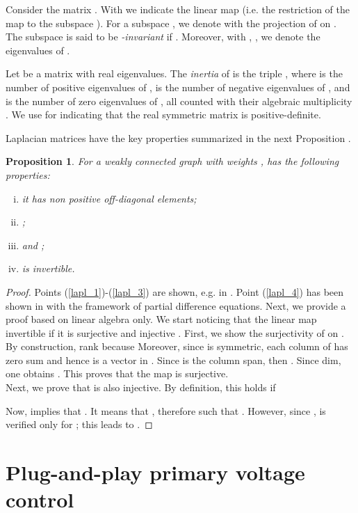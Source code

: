 \documentclass[a4paper]{article}
\theoremstyle{plain}
\newtheorem{prp}{Proposition}
\begin{document}
Consider the matrix . With
 we indicate the linear map 
(i.e. the restriction of the map
 to the subspace ). For a
subspace , we denote with
 the projection of  on
. The subspace  is said to be
\textit{-invariant} if . Moreover, with , , we denote the eigenvalues of .

Let  be a matrix with real eigenvalues. The \textit{inertia} of  is the triple , where  is the number of positive eigenvalues of ,   is the number of negative eigenvalues of , and   is the number of zero eigenvalues of , all counted with their algebraic multiplicity \cite{hong1991jordan}. We use  for indicating that the real symmetric matrix  is positive-definite.

Laplacian matrices have the key properties summarized in the next
Proposition \cite{agaev2005spectra,godsil2001algebraic,bensoussan2005difference}.
\begin{prp}
	\label{pr:laplacian_prop}
	For a weakly connected graph  with weights ,  has the following properties:
	\begin{enumerate}[(i)]
		\item \label{lapl_1}it has non positive off-diagonal elements;
		\item \label{lapl_2} ;
		\item \label{lapl_3}  and ;
		\item \label{lapl_4}  is invertible.
	\end{enumerate}
\end{prp}
\begin{proof}
	Points (\ref{lapl_1})-(\ref{lapl_3}) are shown, e.g. in \cite{agaev2005spectra, godsil2001algebraic}. Point (\ref{lapl_4}) has been shown in \cite{bensoussan2005difference} with the framework of partial difference equations. Next, we provide a proof based on linear algebra only. We start noticing that the linear map  invertible if it is surjective and injective \cite{lang1987linear}. First, we show the surjectivity of  on . By construction, rank because  Moreover, since  is symmetric, each column of  has zero sum and hence is a vector in . Since  is the column span, then . Since dim, one obtains . This proves that the map  is surjective. \\
	Next, we prove that  is also injective. By definition, this holds if
	
	Now,  implies that . It means that , therefore  such that . However, since ,  is verified only for ; this leads to .  
\end{proof}

\section{Plug-and-play primary voltage control}
\label{sec:PnP_primary}
\end{document}
